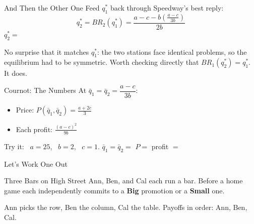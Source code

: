\begin{frame}{And Then the Other One}
Feed $q_1^*$ back through Speedway's best reply:
$$q_2^*=BR_2(q_1^*)=\frac{a-c-b\left(\frac{a-c}{3b}\right)}{2b}$$
\bsk
$q_2^*=$ \underline{\hspace{1.6in}} \vspace{0.8in}

\raggedright
No surprise that it matches $q_1^*$: the two stations face identical problems, so the
equilibrium had to be symmetric.
\vfill
Worth checking directly that $BR_1(q_2^*)=q_1^*$. It does.
\vspace{-0.2in}
\end{frame}

\begin{frame}{Cournot: The Numbers}
At $\bar q_1=\bar q_2=\dfrac{a-c}{3b}$:
\bsk
\begin{itemize}
    \item Price: \hspace{0.55in} $\displaystyle P(\bar q_1,\bar q_2)=\frac{a+2c}{3}$
    \bsk
    \item Each profit: \hspace{0.1in} $\displaystyle \frac{(a-c)^2}{9b}$
\end{itemize}
\bsk
Try it: \ $a=25$, \ $b=2$, \ $c=1$.
\bsk
\centering
$\bar q_1=\bar q_2=$ \underline{\hspace{0.8in}} \hspace{0.4in}
$P=$ \underline{\hspace{0.8in}} \hspace{0.4in}
profit $=$ \underline{\hspace{0.8in}}
\vfill
\end{frame}



\begin{frame}[standout]
Let's Work One Out
\end{frame}

\begin{frame}{Three Bars on High Street}
Ann, Ben, and Cal each run a bar. Before a home game each independently commits
to a \textbf{Big} promotion or a \textbf{Small} one.
\bsk
\centering
{\small
\begin{matrixgame}[top={Big, Small}, left={Big, Small}, bottom={Cal: Big, Cal: Small}, player names={Ann, Ben, Cal}]
\end{matrixgame}}
\bsk
\raggedright
{\footnotesize Ann picks the row, Ben the column, Cal the table. Payoffs in order:
Ann, Ben, Cal.}
\vspace{-0.2in}
\end{frame}

